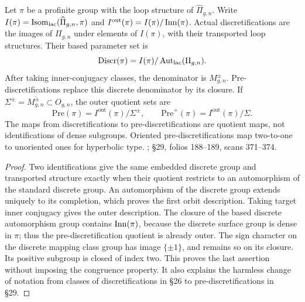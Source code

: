 Let $\pi$ be a profinite group with the loop structure of $\widehat\Pi_{g,n}$. Write
$I(\pi)=\operatorname{Isom}_{\mathrm{lac}}(\widehat\Pi_{g,n},\pi)$ and
$I^{\mathrm{out}}(\pi)=I(\pi)/\operatorname{Inn}(\pi)$.
Actual discretifications are the images of $\Pi_{g,n}$ under elements of $I(\pi)$, with their transported loop structures. Their based parameter set is
\[
\mathrm{Discr}(\pi)=I(\pi)/\operatorname{Aut}_{\mathrm{lac}}(\Pi_{g,n}).
\]
After taking inner-conjugacy classes, the denominator is $M^{\pm}_{g,n}$. Pre-discretifications replace this discrete denominator by its closure. If
$\Sigma^{\pm}=\overline{M^{\pm}_{g,n}}\subset O_{g,n}$, the outer quotient sets are
\[
\mathrm{Pre}(\pi)=I^{\mathrm{out}}(\pi)/\Sigma^{\pm},
\qquad
\mathrm{Pre}^{+}(\pi)=I^{\mathrm{out}}(\pi)/\Sigma.
\]
The maps from discretifications to pre-discretifications are quotient maps, not identifications of dense subgroups. Oriented pre-discretifications map two-to-one to unoriented ones for hyperbolic type.
; \S29, folios 188--189, scans 371--374.
\begin{proof}
Two identifications give the same embedded discrete group and transported structure exactly when their quotient restricts to an automorphism of the standard discrete group. An automorphism of the discrete group extends uniquely to its completion, which proves the first orbit description. Taking target inner conjugacy gives the outer description. The closure of the based discrete automorphism group contains $\operatorname{Inn}(\pi)$, because the discrete surface group is dense in $\pi$; thus the pre-discretification quotient is already outer. The sign character on the discrete mapping class group has image $\{\pm1\}$, and remains so on its closure. Its positive subgroup is closed of index two. This proves the last assertion without imposing the congruence property. It also explains the harmless change of notation from classes of discretifications in \S26 to pre-discretifications in \S29.
\end{proof}


